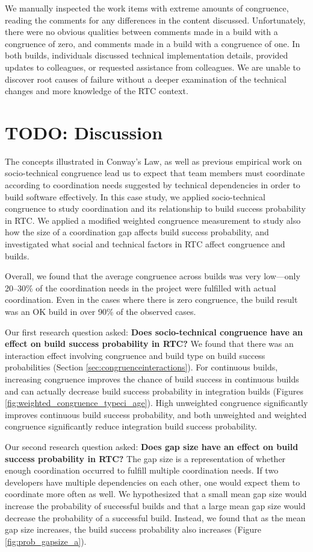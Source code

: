 We manually inspected the work items with extreme amounts of congruence, reading the comments for any differences in the content discussed. Unfortunately, there were no obvious qualities between comments made in a build with a congruence of zero, and comments made in a build with a congruence of one. In both builds, individuals discussed technical implementation details, provided updates to colleagues, or requested assistance from colleagues. We are unable to discover root causes of failure without a deeper examination of the technical changes and more knowledge of the RTC context.


\section{TODO: Discussion}
\label{sec:discussion}
The concepts illustrated in Conway's Law, as well as previous empirical work on socio-technical congruence lead us to expect that team members must coordinate according to coordination needs suggested by technical dependencies in order to build software effectively.
In this case study, we applied socio-technical congruence to study coordination and its relationship to build success probability in RTC. We applied a modified weighted congruence measurement to study also how the size of a coordination gap affects build success probability, and investigated what social and technical factors in RTC affect congruence and builds.

Overall, we found that the average congruence across builds was very low---only 20--30\% of the coordination needs in the project were fulfilled with actual coordination. Even in the cases where there is zero congruence, the build result was an OK build in over 90\% of the observed cases.

Our first research question asked:
\textbf{Does socio-technical congruence have an effect on build success probability in RTC?}
We found that there was an interaction effect involving congruence and build type on build success probabilities (Section \ref{sec:congruenceinteractions}). For continuous builds, increasing congruence improves the chance of build success in continuous builds and can actually decrease build success probability in integration builds (Figures \ref{fig:weighted_congruence_typeci_age}). High unweighted congruence significantly improves continuous build success probability, and both unweighted and weighted congruence significantly reduce integration build success probability.

Our second research question asked:
\textbf{Does gap size have an effect on build success probability
in RTC?}
The gap size is a representation of whether enough coordination
occurred to fulfill multiple coordination needs. If two developers have multiple dependencies on each other, one would expect them to
coordinate more often as well.
We hypothesized that a small mean gap size would increase the probability of successful builds and that a large mean gap size would decrease the probability of a successful build. Instead, we found that as the mean gap size increases, the build success probability also increases (Figure \ref{fig:prob_gapsize_a}).

